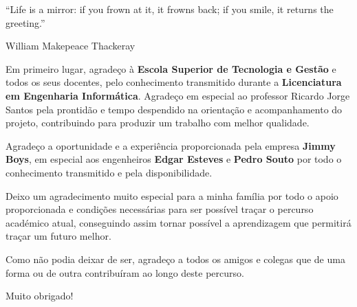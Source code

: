 
\begin{flushright}
	\begin{quotebox50}
		``Life is a mirror: if you frown at it, it frowns back; if you smile, it returns the greeting.''

		\tcblower

		William Makepeace Thackeray
	\end{quotebox50}
\end{flushright}

Em primeiro lugar, agradeço à \textbf{Escola Superior de Tecnologia e Gestão} e todos os seus docentes, pelo conhecimento transmitido durante a \textbf{Licenciatura em Engenharia Informática}. Agradeço em especial ao professor Ricardo Jorge Santos pela prontidão e tempo despendido na orientação e acompanhamento do projeto, contribuindo para produzir um trabalho com melhor qualidade.

Agradeço a oportunidade e a experiência proporcionada pela empresa \textbf{Jimmy Boys}, em especial aos engenheiros \textbf{Edgar Esteves} e \textbf{Pedro Souto} por todo o conhecimento transmitido e pela disponibilidade.

Deixo um agradecimento muito especial para a minha família por todo o apoio proporcionada e condições necessárias para ser possível traçar o percurso académico atual, conseguindo assim tornar possível a aprendizagem que permitirá traçar um futuro melhor.

Como não podia deixar de ser, agradeço a todos os amigos e colegas que de uma forma ou de outra contribuíram ao longo deste percurso.

Muito obrigado!

\newpage